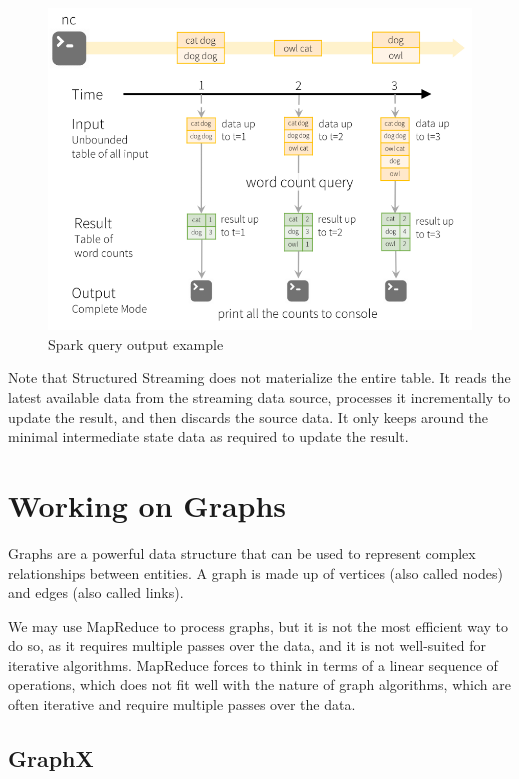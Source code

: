 \begin{figure}[htbp]
   \centering
   \includegraphics{images/18/sparkexample.png}
   \caption{Spark query output example}
   \label{fig:18/sparkexample}
\end{figure}

Note that Structured Streaming does not materialize the entire table.
It reads the latest available data from the streaming data source, processes it incrementally to update the result, and then discards the source data.
It only keeps around the minimal intermediate state data as required to update the result.

\section{Working on Graphs}
Graphs are a powerful data structure that can be used to represent complex relationships between entities.
A graph is made up of vertices (also called nodes) and edges (also called links).

We may use MapReduce to process graphs, but it is not the most efficient way to do so, as it requires multiple passes over the data, and it is not well-suited for iterative algorithms.
MapReduce forces to think in terms of a linear sequence of operations, which does not fit well with the nature of graph algorithms, which are often iterative and require multiple passes over the data.

\subsection{GraphX}

